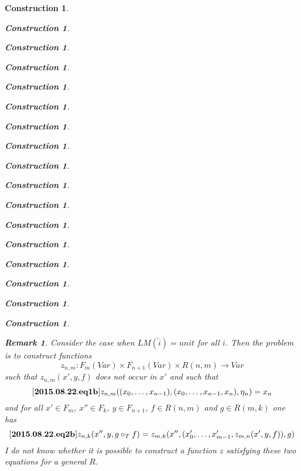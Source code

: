 \documentclass[12pt]{amsart}
\newenvironment{eq}{\begin{equation}}{\end{equation}}
\newtheorem{remark}[proposition]{Remark}
\newtheorem{construction}[proposition]{Construction}
\newcommand{\llabel}[1]{\label{#1}[{\bf #1}]}
\newcommand{\sr}{\rightarrow}
\newcommand{\wh}{\widehat}
\newcommand{\hc}{\circ_{T}}
\begin{document}
\begin{construction}
\begin{construction}
\begin{construction}
\begin{construction}
\begin{construction}
\begin{construction}
\begin{construction}
\begin{construction}
\begin{construction}
\begin{construction}
\begin{construction}
\begin{construction}
\begin{construction}
\begin{construction}
\begin{construction}
\begin{construction}
\begin{construction}
{\begin{remark}
Consider the case when $LM(\wh{i})=unit$ for all $i$. Then the problem is to construct functions 
%
$$z_{n,m}:F_m(Var)\times F_{n+1}(Var)\times R(n,m)\sr Var$$
%
such that $z_{n,m}(x',y,f)$ does not occur in $x'$ and such that
%
\begin{eq}
\llabel{2015.08.22.eq1b}
z_{n,m}((x_0,\dots,x_{n-1}),(x_0,\dots,x_{n-1},x_n),\eta_n)=x_n
\end{eq}
%
and for all $x'\in F_{m}$, $x''\in F_{k}$, $y\in F_{n+1}$, $f\in R(n,m)$ and $g\in R(m,k)$ one has
%
\begin{eq}
\llabel{2015.08.22.eq2b}
z_{n,k}(x'',y,g\hc f)=z_{m,k}(x'',(x'_0,\dots,x'_{m-1},z_{m,n}(x',y,f)),g)
\end{eq}
%
I do not know whether it is possible to construct a function $z$ satisfying these two equations for a general $R$.
\end{remark}
%
}


\end{construction}
\end{construction}
\end{construction}
\end{construction}
\end{construction}
\end{construction}
\end{construction}
\end{construction}
\end{construction}
\end{construction}
\end{construction}
\end{construction}
\end{construction}
\end{construction}
\end{construction}
\end{construction}
\end{construction}
\end{document}
